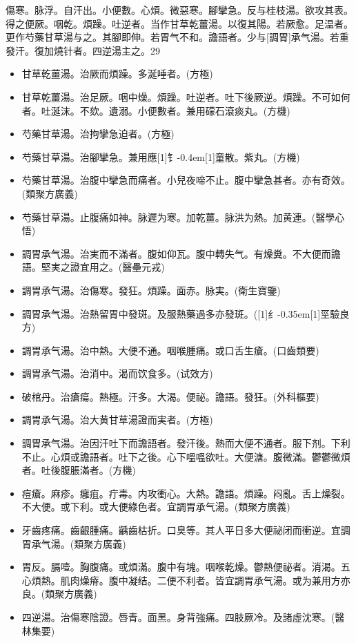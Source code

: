 \documentclass[oneside,b4paper]{ctexbook}
\begin{document}
\begin{flushleft}
傷寒。脉浮。自汗出。小便數。心煩。微惡寒。腳攣急。反与桂枝湯。欲攻其表。得之便厥。咽乾。煩躁。吐逆者。当作甘草乾薑湯。以復其陽。若厥愈。足温者。更作芍藥甘草湯与之。其腳即伸。若胃气不和。譫語者。少与[調胃]承气湯。若重發汗。復加燒针者。四逆湯主之。29

\begin{itemize}
\item 甘草乾薑湯。治厥而煩躁。多涎唾者。(方極)
\item 甘草乾薑湯。治足厥。咽中燥。煩躁。吐逆者。吐下後厥逆。煩躁。不可如何者。吐涎沫。不欬。遺溺。小便數者。兼用礞石滾痰丸。(方機)
\item 芍藥甘草湯。治拘攣急迫者。(方極)
\item 芍藥甘草湯。治腳攣急。兼用應{\hbox{\scalebox{0.7}[1]{钅}\kern-0.4em\scalebox{0.7}[1]{童}}}散。紫丸。(方機)
\item 芍藥甘草湯。治腹中攣急而痛者。小兒夜啼不止。腹中攣急甚者。亦有奇效。(類聚方廣義)
\item 芍藥甘草湯。止腹痛如神。脉遲为寒。加乾薑。脉洪为熱。加黄連。(醫學心悟)
\item 調胃承气湯。治実而不滿者。腹如仰瓦。腹中轉失气。有燥糞。不大便而譫語。堅実之證宜用之。(醫壘元戎)
\item 調胃承气湯。治傷寒。發狂。煩躁。面赤。脉実。(衛生寶鑒)
\item 調胃承气湯。治熱留胃中發斑。及服熱藥過多亦發斑。({\hbox{\scalebox{0.68}[1]{纟}\kern-0.35em\scalebox{0.64}[1]{巠}}}驗良方)
\item 調胃承气湯。治中熱。大便不通。咽喉腫痛。或口舌生瘡。(口齒類要)
\item 調胃承气湯。治消中。渴而饮食多。(试效方)
\item 破棺丹。治瘡瘍。熱極。汗多。大渴。便祕。譫語。發狂。(外科樞要)
\item 調胃承气湯。治大黄甘草湯證而実者。(方極)
\item 調胃承气湯。治因汗吐下而譫語者。發汗後。熱而大便不通者。服下剂。下利不止。心煩或譫語者。吐下之後。心下嗢嗢欲吐。大便溏。腹微滿。鬱鬱微煩者。吐後腹脹滿者。(方機)
\item 痘瘡。麻疹。癰疽。疔毒。内攻衝心。大熱。譫語。煩躁。闷亂。舌上燥裂。不大便。或下利。或大便綠色者。宜調胃承气湯。(類聚方廣義)
\item 牙齒疼痛。齒齦腫痛。齲齒枯折。口臭等。其人平日多大便祕闭而衝逆。宜調胃承气湯。(類聚方廣義)
\item 胃反。膈噎。胸腹痛。或煩滿。腹中有塊。咽喉乾燥。鬱熱便祕者。消渴。五心煩熱。肌肉燥瘠。腹中凝结。二便不利者。皆宜調胃承气湯。或为兼用方亦良。(類聚方廣義)
\item 四逆湯。治傷寒陰證。唇青。面黑。身背強痛。四肢厥冷。及諸虛沈寒。(醫林集要)

\end{itemize}
\end{flushleft}
\end{document}
